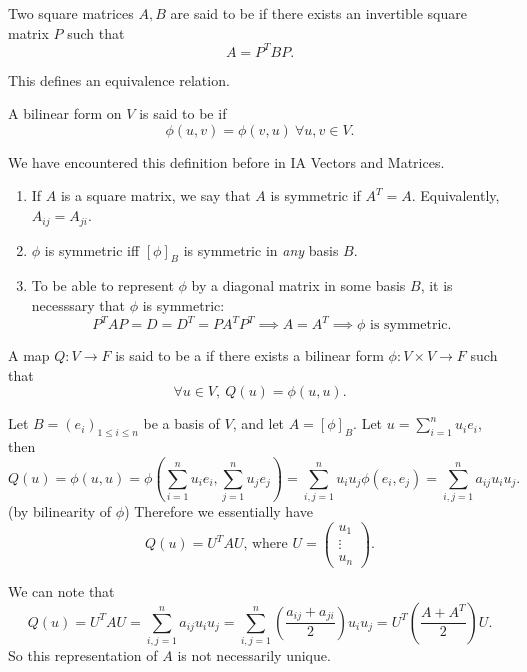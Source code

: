 \documentclass[a4paper]{scrartcl}
\begin{document}
\begin{definition}
     Two square matrices $A,B$ are said to be  if there exists an invertible square matrix $P$ such that 
     \[A=P^T B P.\]
\end{definition}
\begin{remark}
     This defines an equivalence relation.
\end{remark}
\begin{definition}
     A bilinear form on $V$ is said to be  if 
     \[\phi(u,v)=\phi(v,u) \ \forall u,v \in V.\]
\end{definition}
\begin{remark}
     We have encountered this definition before in IA Vectors and Matrices.
    \begin{enumerate}
        \item If $A$ is a square matrix, we say that $A$ is symmetric if $A^T=A$. Equivalently, $A_{ij}=A_{ji}$.
        \item $\phi$ is symmetric iff $[\phi]_B$ is symmetric in \emph{any} basis $B$.
        \item To be able to represent $\phi$ by a diagonal matrix in some basis $B$, it is necesssary that $\phi$ is symmetric: 
        \[P^T AP=D=D^T=P A^T P^T \implies A=A^T \implies \phi \text{ is symmetric} .\]
        
    \end{enumerate}
     
\end{remark}
\begin{definition}
     A map $Q: V \rightarrow F$ is said to be a  if there exists a bilinear form $\phi: V \times V \rightarrow F$ such that 
     \[\forall u \in V, \ Q(u)=\phi (u,u).\]
\end{definition}
\begin{remark}
     Let $B=(e_i)_{1 \leq i \leq n}$ be a basis of $V$, and let $A=[\phi]_B$. Let $u=\sum_{i=1}^{n}u_i e_i$, then 
     \[Q (u)=\phi (u,u)=\phi \left(\sum_{i=1}^{n}u_i e_i, \sum_{j=1}^{n}u_j e_j\right)=\sum_{i,j=1}^{n}u_i u_j \phi(e_i,e_j)=\sum_{i,j=1}^{n}a_{ij} u_i u_j.\]
     (by bilinearity of $\phi$)
     Therefore we essentially have 
     \[Q (u)=U^T A U \text{, where } U=\begin{pmatrix}
     u_1\\\vdots \\ u_n
     \end{pmatrix}
     .\]
\end{remark}
\begin{remark}
     We can note that 
     \[Q (u)=U^T A U =\sum_{i,j=1}^{n}a_{ij}u_i u_j=\sum_{i,j=1}^{n}(\frac{a_{ij}+a_{ji}}{2})u_i u_j=U^T (\frac{A+A^T}{2}) U.\]
     So this representation of $A$ is not necessarily unique.
\end{remark}
\end{document}
